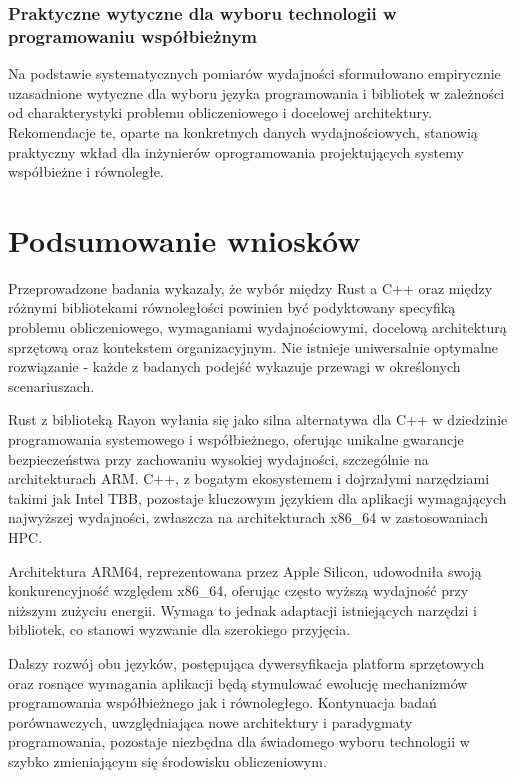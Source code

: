 \subsubsection{Praktyczne wytyczne dla wyboru technologii w programowaniu współbieżnym}

Na podstawie systematycznych pomiarów wydajności sformułowano empirycznie uzasadnione wytyczne dla wyboru języka programowania i bibliotek w zależności od charakterystyki problemu obliczeniowego i docelowej architektury. Rekomendacje te, oparte na konkretnych danych wydajnościowych, stanowią praktyczny wkład dla inżynierów oprogramowania projektujących systemy współbieżne i równoległe.

\section{Podsumowanie wniosków}

Przeprowadzone badania wykazały, że wybór między Rust a C++ oraz między różnymi bibliotekami równoległości powinien być podyktowany specyfiką problemu obliczeniowego, wymaganiami wydajnościowymi, docelową architekturą sprzętową oraz kontekstem organizacyjnym. Nie istnieje uniwersalnie optymalne rozwiązanie - każde z badanych podejść wykazuje przewagi w określonych scenariuszach.

Rust z biblioteką Rayon wyłania się jako silna alternatywa dla C++ w dziedzinie programowania systemowego i współbieżnego, oferując unikalne gwarancje bezpieczeństwa przy zachowaniu wysokiej wydajności, szczególnie na architekturach ARM. C++, z bogatym ekosystemem i dojrzałymi narzędziami takimi jak Intel TBB, pozostaje kluczowym językiem dla aplikacji wymagających najwyższej wydajności, zwłaszcza na architekturach x86\_64 w zastosowaniach HPC.

Architektura ARM64, reprezentowana przez Apple Silicon, udowodniła swoją konkurencyjność względem x86\_64, oferując często wyższą wydajność przy niższym zużyciu energii. Wymaga to jednak adaptacji istniejących narzędzi i bibliotek, co stanowi wyzwanie dla szerokiego przyjęcia.

Dalszy rozwój obu języków, postępująca dywersyfikacja platform sprzętowych oraz rosnące wymagania aplikacji będą stymulować ewolucję mechanizmów programowania współbieżnego jak i równoległego. Kontynuacja badań porównawczych, uwzględniająca nowe architektury i paradygmaty programowania, pozostaje niezbędna dla świadomego wyboru technologii w szybko zmieniającym się środowisku obliczeniowym.


